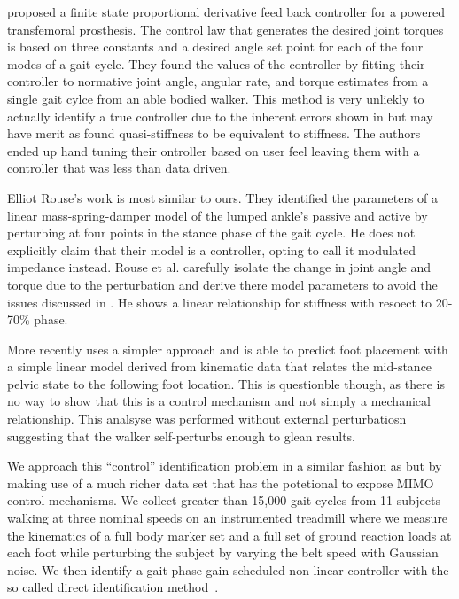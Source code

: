\documentclass{article}
\begin{document}
\cite{Sup2008} proposed a finite state proportional derivative feed back
controller for a powered transfemoral prosthesis. The control law that
generates the desired joint torques is based on three constants and a desired
angle set point for each of the four modes of a gait cycle. They found the
values of the controller by fitting their controller to normative joint angle,
angular rate, and torque estimates from a single gait cylce from an able bodied
walker. This method is very unliekly to actually identify a true controller due
to the inherent errors shown in \cite{Rouse2013} but may have merit as
\cite{Rouse2014} found quasi-stiffness to be equivalent to stiffness. The
authors ended up hand tuning their ontroller based on user feel leaving them
with a controller that was less than data driven.

Elliot Rouse's \cite{Rousse2014} work is most similar to ours. They identified
the parameters of a linear mass-spring-damper model of the lumped ankle's
passive and active by perturbing at four points in the stance phase of the gait
cycle.  He does not explicitly claim that their model is a controller, opting
to call it modulated impedance instead. Rouse et al. carefully isolate the
change in joint angle and torque due to the perturbation and derive there model
parameters to avoid the issues discussed in \cite{Rouse2013}. He shows a linear
relationship for stiffness with resoect to 20-70\% phase.

More recently \cite{Wang2014} uses a simpler approach and is able to predict
foot placement with a simple linear model derived from kinematic data that
relates the mid-stance pelvic state to the following foot location. This is
questionble though, as there is no way to show that this is a control mechanism
and not simply a mechanical relationship. This analsyse was performed without
external perturbatiosn suggesting that the walker self-perturbs enough to glean
results.

We approach this ``control'' identification problem in a similar fashion as
\cite{Rouse2014} but by making use of a much richer data set that has the
potetional to expose MIMO control mechanisms. We collect greater than 15,000
gait cycles from 11 subjects walking at three nominal speeds on an instrumented
treadmill where we measure the kinematics of a full body marker set and a full
set of ground reaction loads at each foot while perturbing the subject by
varying the belt speed with Gaussian noise. We then identify a gait phase gain
scheduled non-linear controller with the so called direct identification
method~\cite{Ljung1999}.
\end{document}
